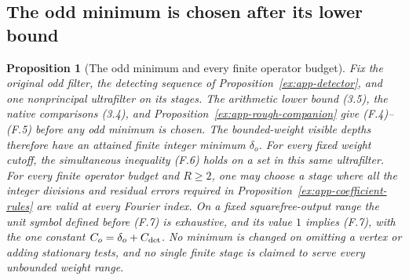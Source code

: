 \documentclass[11pt]{article}
\newtheorem{proposition}[theorem]{Proposition}
\theoremstyle{definition}
\theoremstyle{remark}
\begin{document}
\subsection{The odd minimum is chosen after its lower bound}
\begin{proposition}[The odd minimum and every finite operator budget]\label{ex:app-odd-minimum}
Fix the original odd filter, the detecting sequence of
Proposition~\ref{ex:app-detector}, and one nonprincipal ultrafilter
on its stages. The arithmetic lower bound (3.5), the native comparisons
(3.4), and Proposition~\ref{ex:app-rough-companion} give (F.4)--(F.5)
before any odd minimum is chosen. The bounded-weight visible depths
therefore have an attained finite integer minimum $\delta_o$.
For every fixed weight cutoff, the simultaneous inequality (F.6)
holds on a set in this same ultrafilter. For every finite operator
budget and $R\ge2$, one may choose a stage where all the integer
divisions and residual errors required in
Proposition~\ref{ex:app-coefficient-rules} are valid at every Fourier
index.
On a fixed squarefree-output range the unit symbol defined before
(F.7) is exhaustive, and its value $1$ implies (F.7), with the one
constant $C_o=\delta_o+C_{\rm det}$. No minimum is changed on
omitting a vertex or adding stationary tests, and no single finite
stage is claimed to serve every unbounded weight range.
\end{proposition}
\end{document}
